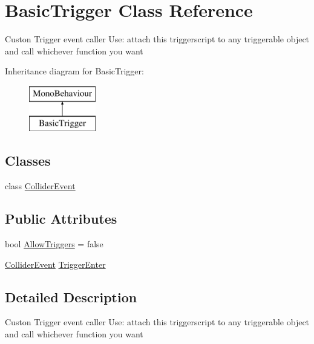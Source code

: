 \hypertarget{class_basic_trigger}{}\section{Basic\+Trigger Class Reference}
\label{class_basic_trigger}


Custon Trigger event caller Use\+: attach this triggerscript to any triggerable object and call whichever function you want  


Inheritance diagram for Basic\+Trigger\+:\begin{figure}[H]
\begin{center}
\leavevmode
\includegraphics[height=2.000000cm]{class_basic_trigger}
\end{center}
\end{figure}
\subsection*{Classes}
\begin{DoxyCompactItemize}
\item 
class \mbox{\hyperlink{class_basic_trigger_1_1_collider_event}{Collider\+Event}}
\end{DoxyCompactItemize}
\subsection*{Public Attributes}
\begin{DoxyCompactItemize}
\item 
bool \mbox{\hyperlink{class_basic_trigger_a319c21e548d897c9323ca2ebdbdc6c5c}{Allow\+Triggers}} = false
\item 
\mbox{\hyperlink{class_basic_trigger_1_1_collider_event}{Collider\+Event}} \mbox{\hyperlink{class_basic_trigger_aa8792e4f8de7efc8fb242c8ba181c17e}{Trigger\+Enter}}
\end{DoxyCompactItemize}


\subsection{Detailed Description}
Custon Trigger event caller Use\+: attach this triggerscript to any triggerable object and call whichever function you want 



